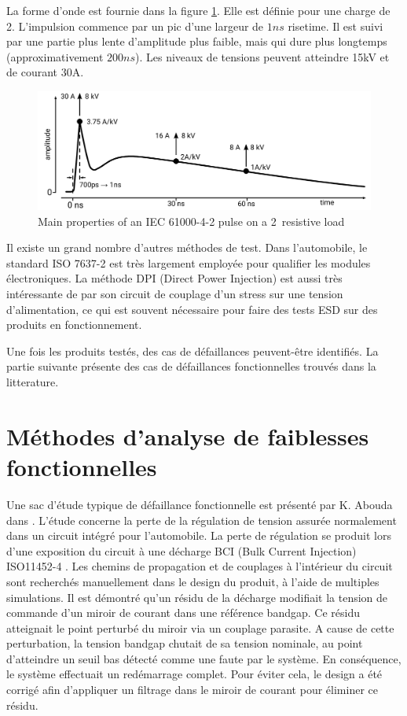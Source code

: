 La forme d'onde est fournie dans la figure \ref{iec_pulse}.
Elle est définie pour une charge de 2\textOmega{}.
L'impulsion commence par un pic d'une largeur de $1ns$ risetime.
Il est suivi par une partie plus lente d'amplitude plus faible, mais qui dure plus longtemps (approximativement $200ns$).
Les niveaux de tensions peuvent atteindre 15kV et de courant 30A.

\begin{figure}[!h]
  \centering
  \includegraphics[width=\textwidth]{src/1/figures/iec61000-4-2_waveform.pdf}
  \caption{Main properties of an IEC 61000-4-2 pulse on a 2\textOmega\ resistive load}
  \label{iec_pulse}
\end{figure}

Il existe un grand nombre d'autres méthodes de test.
Dans l'automobile, le standard ISO 7637-2 est très largement employée pour qualifier les modules électroniques.
La méthode DPI (Direct Power Injection) est aussi très intéressante de par son circuit de couplage d'un stress sur une tension d'alimentation, ce qui est souvent nécessaire pour faire des tests ESD sur des produits en fonctionnement.

Une fois les produits testés, des cas de défaillances peuvent-être identifiés.
La partie suivante présente des cas de défaillances fonctionnelles trouvés dans la litterature.

\section{Méthodes d'analyse de faiblesses fonctionnelles}

Une sac d'étude typique de défaillance fonctionnelle est présenté par K. Abouda dans \cite{softfailEMCIC}.
L'étude concerne la perte de la régulation de tension assurée normalement dans un circuit intégré pour l'automobile.
La perte de régulation se produit lors d'une exposition du circuit à une décharge BCI (Bulk Current Injection) ISO11452-4 \cite{iso11452}.
Les chemins de propagation et de couplages à l'intérieur du circuit sont recherchés manuellement dans le design du produit, à l'aide de multiples simulations.
Il est démontré qu'un résidu de la décharge modifiait la tension de commande d'un miroir de courant dans une référence bandgap.
Ce résidu atteignait le point perturbé du miroir via un couplage parasite.
A cause de cette perturbation, la tension bandgap chutait de sa tension nominale, au point d'atteindre un seuil bas détecté comme une faute par le système.
En conséquence, le système effectuait un redémarrage complet.
Pour éviter cela, le design a été corrigé afin d'appliquer un filtrage dans le miroir de courant pour éliminer ce résidu.

